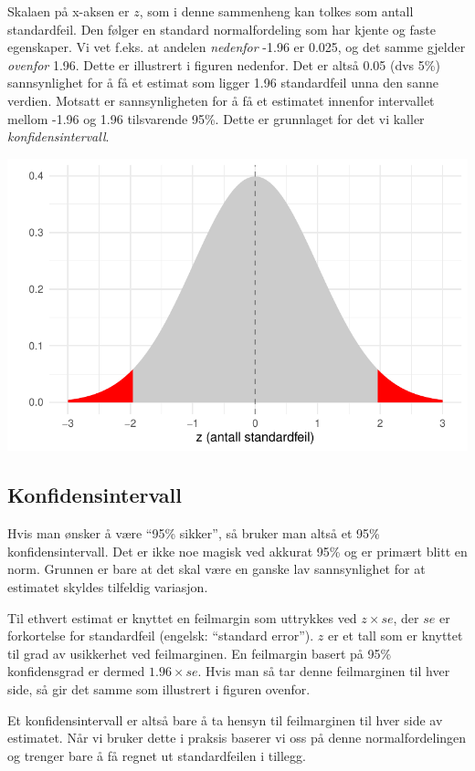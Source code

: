 \documentclass[
  letterpaper,
  DIV=11,
  numbers=noendperiod]{scrreprt}
\theoremstyle{definition}
\theoremstyle{remark}
\begin{document}
Skalaen på x-aksen er \(z\), som i denne sammenheng kan tolkes som
antall standardfeil. Den følger en standard normalfordeling som har
kjente og faste egenskaper. Vi vet f.eks. at andelen \emph{nedenfor}
-1.96 er 0.025, og det samme gjelder \emph{ovenfor} 1.96. Dette er
illustrert i figuren nedenfor. Det er altså 0.05 (dvs 5\%) sannsynlighet
for å få et estimat som ligger 1.96 standardfeil unna den sanne verdien.
Motsatt er sannsynligheten for å få et estimatet innenfor intervallet
mellom -1.96 og 1.96 tilsvarende 95\%. Dette er grunnlaget for det vi
kaller \emph{konfidensintervall}.

\includegraphics{./statistiskTolkning_files/figure-pdf/unnamed-chunk-2-1.pdf}

\hypertarget{konfidensintervall}{%
\subsection{Konfidensintervall}\label{konfidensintervall}}

Hvis man ønsker å være ``95\% sikker'', så bruker man altså et 95\%
konfidensintervall. Det er ikke noe magisk ved akkurat 95\% og er
primært blitt en norm. Grunnen er bare at det skal være en ganske lav
sannsynlighet for at estimatet skyldes tilfeldig variasjon.

Til ethvert estimat er knyttet en feilmargin som uttrykkes ved
\(z \times se\), der \(se\) er forkortelse for standardfeil (engelsk:
``standard error''). \(z\) er et tall som er knyttet til grad av
usikkerhet ved feilmarginen. En feilmargin basert på 95\% konfidensgrad
er dermed \(1.96 \times se\). Hvis man så tar denne feilmarginen til
hver side, så gir det samme som illustrert i figuren ovenfor.

Et konfidensintervall er altså bare å ta hensyn til feilmarginen til
hver side av estimatet. Når vi bruker dette i praksis baserer vi oss på
denne normalfordelingen og trenger bare å få regnet ut standardfeilen i
tillegg.
\end{document}
